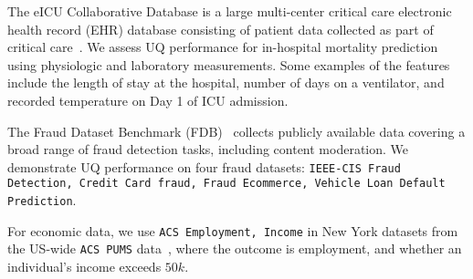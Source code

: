 
 The eICU Collaborative Database  is a large multi-center critical care electronic health record (EHR) database consisting of patient data collected as part of critical care~\citep{PollardJoRaCeMaBa18}. We assess UQ performance for in-hospital mortality prediction using physiologic and laboratory measurements. Some examples of the features
include the  length of stay at the hospital, number of days on a ventilator, and  recorded temperature on Day 1 of ICU admission.

The Fraud Dataset Benchmark (FDB)~\citep{GroverXuTiCheLiZaLiZh22} collects publicly available data  covering a broad range of fraud detection tasks, including content moderation. We demonstrate UQ performance on four fraud datasets: \texttt{IEEE-CIS Fraud Detection, Credit Card fraud, Fraud Ecommerce, Vehicle Loan Default Prediction}. 

 For economic data, we use \texttt{ACS Employment, Income}  in New York datasets from the US-wide \texttt{ACS PUMS} data~\citep{DingHaMoSc21}, where
the outcome is employment, and whether an individual’s income exceeds $50k$.   
 

